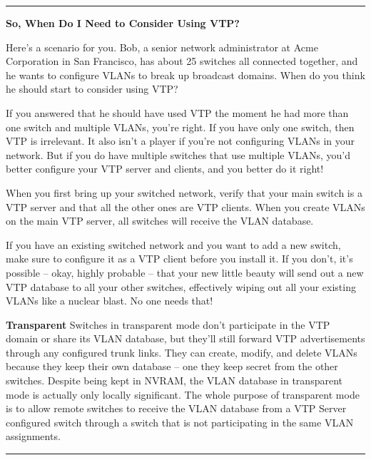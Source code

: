 \documentclass[b5paper,11pt]{memoir}
\begin{document}
\begin{center}\rule{0.5\linewidth}{0.5pt}\end{center}

\textbf{So, When Do I Need to Consider Using VTP?}

Here's a scenario for you. Bob, a senior network administrator at Acme
Corporation in San Francisco, has about 25 switches all connected
together, and he wants to configure VLANs to break up broadcast domains.
When do you think he should start to consider using VTP?

If you answered that he should have used VTP the moment he had more than
one switch and multiple VLANs, you're right. If you have only one
switch, then VTP is irrelevant. It also isn't a player if you're not
configuring VLANs in your network. But if you do have multiple switches
that use multiple VLANs, you'd better configure your VTP server and
clients, and you better do it right!

When you first bring up your switched network, verify that your main
switch is a VTP server and that all the other ones are VTP clients. When
you create VLANs on the main VTP server, all switches will receive the
VLAN database.

If you have an existing switched network and you want to add a new
switch, make sure to configure it as a VTP client before you install it.
If you don't, it's possible -- okay, highly probable -- that your new
little beauty will send out a new VTP database to all your other
switches, effectively wiping out all your existing VLANs like a nuclear
blast. No one needs that!

\textbf{Transparent}
Switches in transparent mode don't participate in the VTP domain or
share its VLAN database, but they'll still forward VTP advertisements
through any configured trunk links. They can create, modify, and delete
VLANs because they keep their own database -- one they keep secret from
the other switches. Despite being kept in NVRAM, the VLAN database in
transparent mode is actually only locally significant. The whole purpose
of transparent mode is to allow remote switches to receive the VLAN
database from a VTP Server configured switch through a switch that is
not participating in the same VLAN assignments.

\begin{center}\rule{0.5\linewidth}{0.5pt}\end{center}
\end{document}
